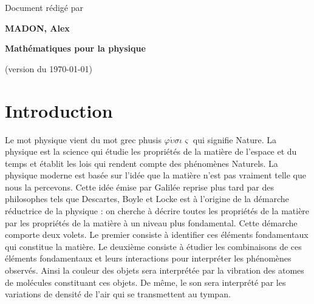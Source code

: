 \documentclass[12pt]{book}
\newif\ifpdf\ifx\pdfoutput\undefined\pdffalse\else\pdfoutput=1\pdftrue\fi
\begin{document}
\ifpdf{}\else\fi


\def\tiii{
\begin{titlepage}

\begin{center}
\null
\par
\vspace{20mm}

{Document r\'edig\'e par}

\vspace{5mm}

{\large\bf MADON, Alex}

\vspace{15mm}

{\Large\bf Math\'ematiques pour la physique}


\vspace{65mm}

(version du \today)
\end{center}
\end{titlepage}
}%
\tiii
\tableofcontents


\chapter{Introduction}
Le mot physique vient du mot grec phusis
$\varphi\acute\upsilon\sigma\iota\varsigma$ 
qui  signifie Nature. La
physique est la science qui \'etudie les propri\'et\'es de la
mati\`ere de l'espace et du temps et \'etablit les lois qui rendent
compte des ph\'enom\`enes Naturels. La physique moderne est bas\'ee
sur l'id\'ee que la mati\`ere n'est pas vraiment telle que nous la
percevons. Cette id\'ee \'emise par Galil\'ee reprise plus tard par
des philosophes tels que Descartes, Boyle et Locke est \`a l'origine
de la d\'emarche r\'eductrice de la physique : on cherche \`a
d\'ecrire toutes les propri\'et\'es de la mati\`ere par les
propri\'et\'es de la mati\`ere \`a un niveau plus fondamental. 
Cette d\'emarche comporte deux volets. Le premier consiste \`a
identifier ces \'el\'ements fondamentaux qui constitue la mati\`ere.
Le deuxi\`eme consiste \`a \'etudier les combinaisons de ces
\'el\'ements fondamentaux et leurs interactions pour interpr\'eter les
ph\'enom\`enes observ\'es. Ainsi la couleur des objets sera
interpr\'et\'ee par la vibration des atomes de mol\'ecules constituant
ces objets. De m\^eme, le son sera interpr\'et\'e par les variations de
densit\'e de l'air qui se transmettent au tympan.
\end{document}
